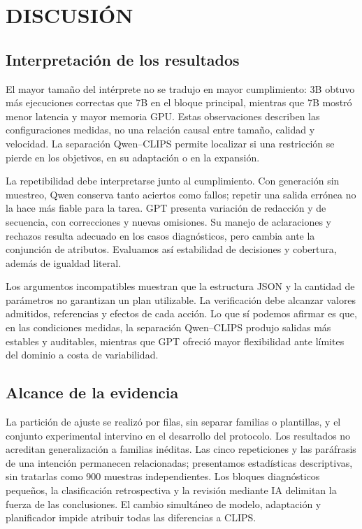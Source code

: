 \documentclass[a4paper,twoside]{article}
\begin{document}
\section{DISCUSIÓN}
\subsection{Interpretación de los resultados}
El mayor tamaño del intérprete no se tradujo en mayor cumplimiento: 3B obtuvo más ejecuciones correctas que 7B en el bloque principal, mientras que 7B mostró menor latencia y mayor memoria GPU. Estas observaciones describen las configuraciones medidas, no una relación causal entre tamaño, calidad y velocidad. La separación Qwen--CLIPS permite localizar si una restricción se pierde en los objetivos, en su adaptación o en la expansión.

La repetibilidad debe interpretarse junto al cumplimiento. Con generación sin muestreo, Qwen conserva tanto aciertos como fallos; repetir una salida errónea no la hace más fiable para la tarea. GPT presenta variación de redacción y de secuencia, con correcciones y nuevas omisiones. Su manejo de aclaraciones y rechazos resulta adecuado en los casos diagnósticos, pero cambia ante la conjunción de atributos. Evaluamos así estabilidad de decisiones y cobertura, además de igualdad literal.

Los argumentos incompatibles muestran que la estructura JSON y la cantidad de parámetros no garantizan un plan utilizable. La verificación debe alcanzar valores admitidos, referencias y efectos de cada acción. Lo que sí podemos afirmar es que, en las condiciones medidas, la separación Qwen--CLIPS produjo salidas más estables y auditables, mientras que GPT ofreció mayor flexibilidad ante límites del dominio a costa de variabilidad.

\subsection{Alcance de la evidencia}
La partición de ajuste se realizó por filas, sin separar familias o plantillas, y el conjunto experimental intervino en el desarrollo del protocolo. Los resultados no acreditan generalización a familias inéditas. Las cinco repeticiones y las paráfrasis de una intención permanecen relacionadas; presentamos estadísticas descriptivas, sin tratarlas como 900 muestras independientes. Los bloques diagnósticos pequeños, la clasificación retrospectiva y la revisión mediante IA delimitan la fuerza de las conclusiones. El cambio simultáneo de modelo, adaptación y planificador impide atribuir todas las diferencias a CLIPS.
\end{document}
